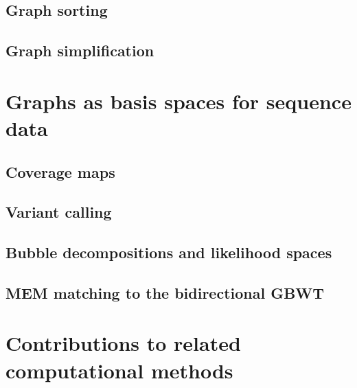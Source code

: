 \subsection{Graph sorting}

\subsection{Graph simplification}


\section{Graphs as basis spaces for sequence data}
\label{sec:basis_space}

\subsection{Coverage maps}

\subsection{Variant calling}

\subsection{Bubble decompositions and likelihood spaces}

\subsection{MEM matching to the bidirectional GBWT}


\section{Contributions to related computational methods}


